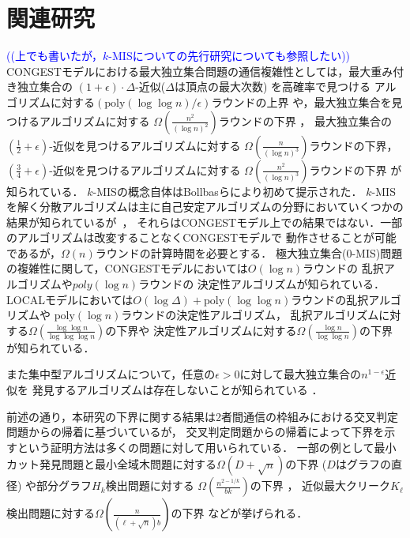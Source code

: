 \documentclass[12pt]{thesis}
\newcommand{\Izumi}[1]{\textcolor{blue}{(#1)}}
\newcommand{\CONGEST}{\textsf{CONGEST}}
\newcommand{\LOCAL}{\textsf{LOCAL}}
\theoremstyle{definition}
\begin{document}
\section{関連研究} 
\Izumi{(上でも書いたが，$k$-MISについての先行研究についても参照したい)}
{\CONGEST}モデルにおける最大独立集合問題の通信複雑性としては，最大重み付き独立集合の
$(1 + \epsilon) \cdot \Delta$-近似($\Delta$は頂点の最大次数) を高確率で見つける
アルゴリズムに対する$\left(\mathrm{poly}(\log \log n)/\epsilon \right)$ラウンドの上界
\cite{kawarabayashi2019improved} や，最大独立集合を見つけるアルゴリズムに対する
$\Omega \left(\frac{n^{2}}{(\log n)^{2}}\right)$ラウンドの下界 \cite{censor2017quadratic}，
最大独立集合の$(\frac{1}{2} + \epsilon)$-近似を見つけるアルゴリズムに対する
$\Omega \left(\frac{n}{(\log n)^{3}}\right)$ラウンドの下界，
$(\frac{3}{4} + \epsilon)$-近似を見つけるアルゴリズムに対する
$\Omega \left(\frac{n^{2}}{(\log n)^{3}}\right)$ラウンドの下界 \cite{efron2020beyond} が知られている．
$k$-MISの概念自体はBollbasらにより初めて提示された\cite{bollobas1991generalised}．
$k$-MISを解く分散アルゴリズムは主に自己安定アルゴリズムの分野においていくつかの結果が知られているが~\cite{turau2007linear,tanaka2019self}，
それらは{\CONGEST}モデル上での結果ではない．一部のアルゴリズムは改変することなく{\CONGEST}モデルで
動作させることが可能であるが，$\Omega(n)$ラウンドの計算時間を必要とする．
極大独立集合(0-MIS)問題の複雑性に関して，{\CONGEST}モデルにおいては$O(\log n)$ラウンドの
乱択アルゴリズム\cite{luby1986simple}や$poly(\log n)$ラウンドの
決定性アルゴリズム\cite{rozhovn2020polylogarithmic}が知られている．
{\LOCAL}モデルにおいては$O(\log \Delta) + \mathrm{poly}(\log \log n)$ラウンドの乱択アルゴリズムや
$\mathrm{poly}(\log n)$ラウンドの決定性アルゴリズム\cite{rozhovn2020polylogarithmic}，
乱択アルゴリズムに対する$\Omega \left(\frac{\log \log n}{\log \log \log n} \right)$の下界や
決定性アルゴリズムに対する$\Omega \left(\frac{\log n}{\log \log n} \right)$の下界
\cite{balliu2019lower}が知られている．

また集中型アルゴリズムについて，任意の$\epsilon > 0$に対して最大独立集合の$n^{1 - \epsilon}$近似を
発見するアルゴリズムは存在しないことが知られている \cite{haastad1999clique}．
 
前述の通り，本研究の下界に関する結果は2者間通信の枠組みにおける交叉判定問題からの帰着に基づいているが，
交叉判定問題からの帰着によって下界を示すという証明方法は多くの問題に対して用いられている．
一部の例として最小カット発見問題と最小全域木問題に対する$\Omega (D + \sqrt{n})$の下界
($D$はグラフの直径) \cite{sarma2012distributed}や部分グラフ$H_{k}$検出問題に対する
$\Omega \left(\frac{n^{2 - 1/k}}{bk}\right)$の下界 \cite{fischer2018possibilities}，
近似最大クリーク$K_{\ell}$検出問題に対する$\Omega \left(\frac{n}{(\ell + \sqrt{n})b}\right)$の下界
 \cite{czumaj2020detecting}などが挙げられる．
\end{document}
